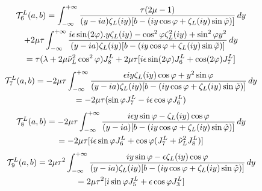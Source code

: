 \begin{multline}
\mathcal{T}_6^L(a,b)=   \int_{-\infty}^{+\infty}\frac{\tau(2\mu-1)}{(y-ia)\zeta_L(iy)\lbrack b- (iy\cos \varphi+\zeta_L(iy)\sin\phiti) \rbrack} \, dy \\
+2\mu\tau\int_{-\infty}^{+\infty} \frac{ i\epsilon\sin(2\varphi).y\zeta_L(iy)- \cos^2\varphi \zeta_L^2(iy)+ \sin^2\varphi y^2}{(y-ia)\zeta_L(iy)\lbrack b- (iy\cos \varphi+\zeta_L(iy)\sin\phiti) \rbrack} \, dy \\
\hfill =\tau(\lambda+2\mu\nuti_L^2\cos^2\varphi)J_8^L+2\mu\tau\lbrack i\epsilon \sin(2\varphi)J_6^L+\cos(2\varphi)J_7^L \rbrack \hfill
\end{multline}
\begin{multline}
\mathcal{T}_7^L(a,b)=-2\mu \tau \int_{-\infty}^{+\infty} \frac{ \epsilon iy\zeta_L(iy)\cos\varphi+y^2\sin\varphi}{(y-ia)\zeta_L(iy)\lbrack b- (iy\cos \varphi+\zeta_L(iy)\sin\phiti) \rbrack} \, dy \\
\hfill =-2\mu\tau(\sin\varphi J_7^L-i\epsilon\cos\varphi J_6^L) \hfill
\end{multline}
\begin{multline}
\mathcal{T}_8^L(a,b)=-2\mu \tau \int_{-\infty}^{+\infty} \frac{i\epsilon y \sin\varphi-\zeta_L(iy)\cos\varphi}{(y-ia)\lbrack b- (iy\cos \varphi+\zeta_L(iy)\sin\phiti) \rbrack} \, dy\\
\hfill=-2\mu\tau\lbrack i\epsilon\sin\varphi J_6^L+\cos\varphi(J_7^L+\nuti_L^2J_8^L) \rbrack\hfill
\end{multline}
\begin{multline}
\mathcal{T}_9^L(a,b)=2\mu \tau^2 \int_{-\infty}^{+\infty} \frac{i y\sin\varphi- \epsilon\zeta_L(iy)\cos\varphi}{(y-ia)\zeta_L(iy)\lbrack b- (iy\cos \varphi+\zeta_L(iy)\sin\phiti) \rbrack} \, dy \\
\hfill=2\mu\tau^2\lbrack i\sin\varphi J_5^L+\epsilon\cos\varphi J_3^L \rbrack \hfill
\end{multline}

